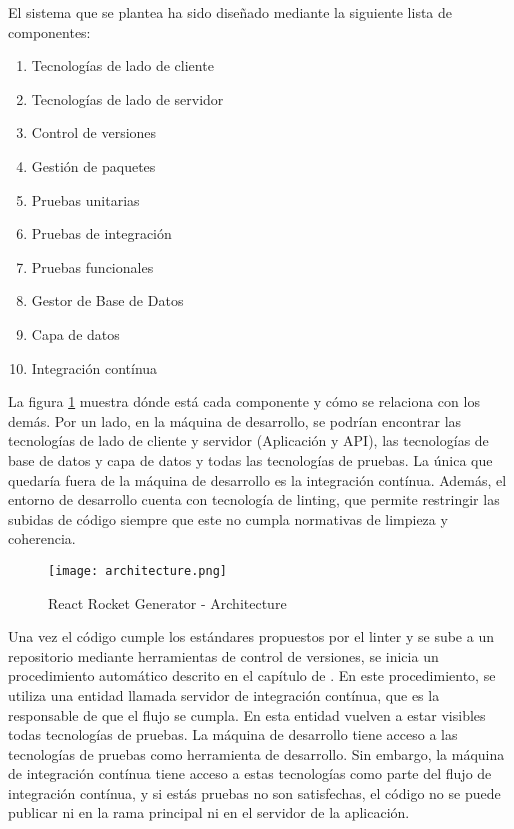 El sistema que se plantea ha sido diseñado mediante la siguiente lista de componentes:
\begin{enumerate}
  \item Tecnologías de lado de cliente
  \item Tecnologías de lado de servidor
  \item Control de versiones
  \item Gestión de paquetes
  \item Pruebas unitarias
  \item Pruebas de integración
  \item Pruebas funcionales
  \item Gestor de Base de Datos
  \item Capa de datos
  \item Integración contínua
\end{enumerate}

La figura \cref{fig:architecture} muestra dónde está cada componente y cómo se relaciona con los demás. Por un lado, en la máquina de desarrollo, se podrían encontrar las tecnologías de lado de cliente y servidor (Aplicación y API), las tecnologías de base de datos y capa de datos y todas las tecnologías de pruebas. La única que quedaría fuera de la máquina de desarrollo es la integración contínua. Además, el entorno de desarrollo cuenta con tecnología de linting, que permite restringir las subidas de código siempre que este no cumpla normativas de limpieza y coherencia.

\begin{figure}
  \centering
  \texttt{[image: architecture.png]}
  \caption{React Rocket Generator - Architecture}
  \label{fig:architecture}
\end{figure}

Una vez el código cumple los estándares propuestos por el linter y se sube a un repositorio mediante herramientas de control de versiones, se inicia un procedimiento automático descrito en el capítulo de . En este procedimiento, se utiliza una entidad llamada servidor de integración contínua, que es la responsable de que el flujo se cumpla. En esta entidad vuelven a estar visibles todas tecnologías de pruebas. La máquina de desarrollo tiene acceso a las tecnologías de pruebas como herramienta de desarrollo. Sin embargo, la máquina de integración contínua tiene acceso a estas tecnologías como parte del flujo de integración contínua, y si estás pruebas no son satisfechas, el código no se puede publicar ni en la rama principal ni en el servidor de la aplicación.

